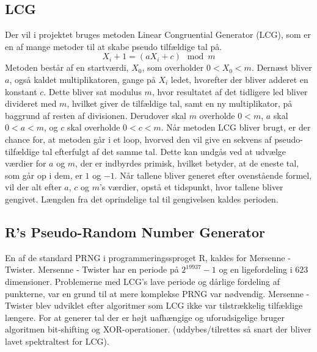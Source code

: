 \subsection{LCG}
Der vil i projektet bruges metoden Linear Congruential Generator (LCG), som er en af mange metoder til at skabe pseudo tilfældige tal på. 
\\
\[X_i+1 = (aX_i+c)\mod m\]
Metoden består af en startværdi, $X_0$, som overholder $0 < X_0 < m$. Dernæst bliver $a$, også kaldet multiplikatoren, gange på $X_i$ ledet, hvorefter der bliver adderet en konstant $c$. Dette bliver sat modulus $m$, hvor resultatet af det tidligere led bliver divideret med $m$, hvilket giver de tilfældige tal, samt en ny multiplikator, på baggrund af resten af divisionen. Derudover skal $m$ overholde $0 < m$, $a$ skal $0 < a < m$, og $c$ skal overholde $0 < c < m$. Når metoden LCG bliver brugt, er der chance for, at metoden går i et loop, hvorved den vil give en sekvens af pseudo-tilfældige tal efterfulgt af det samme tal. Dette kan undgås ved at udvælge værdier for $a$ og $m$, der er indbyrdes primisk, hvilket betyder, at de eneste tal, som går op i dem, er $1$ og $-1$. Når tallene bliver generet efter ovenstående formel, vil der alt efter $a$, $c$ og $m$'s værdier, opstå et tidspunkt, hvor tallene bliver gengivet. Længden fra det oprindelige tal til gengivelsen kaldes perioden.

\subsection{R's Pseudo-Random Number Generator}
En af de standard PRNG i programmeringssproget R, kaldes for Mersenne - Twister. Mersenne - Twister har en periode på $2^{19937}-1$ og en ligefordeling i $623$ dimensioner. Problemerne med LCG's lave periode og dårlige fordeling af punkterne, var en grund til at mere komplekse PRNG var nødvendig. Mersenne - Twister blev udviklet efter algoritmer som LCG ikke var tilstrækkelig tilfældige længere. For at generer tal der er højt uafhængige og uforudsigelige bruger algoritmen bit-shifting og XOR-operationer. (uddybes/tilrettes så snart der bliver lavet spektraltest for LCG). 


